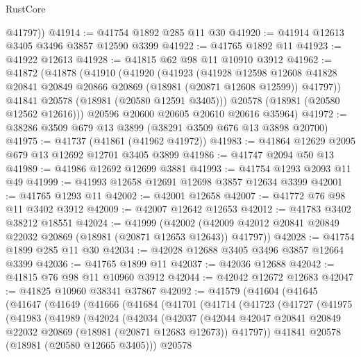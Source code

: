 \begin{lexlean}{RustCore}
\begin{coremodule}
        @41797))
@41914 := @41754 @1892 @285 @11 @30
@41920 := @41914 @12613 @3405 @3496 @3857 @12590 @3399
@41922 := @41765 @1892 @11
@41923 := @41922 @12613
@41928 := @41815 @62 @98 @11 @10910 @3912
@41962 := @41872
    (@41878
      (@41910
        (@41920
          (@41923
            (@41928
              @12598
              @12608
              @41828
              @20841
              @20849
              @20866
              @20869
              (@18981 (@20871 @12608 @12599))
              @41797))
          @41841
          @20578
          (@18981 (@20580 @12591 @3405)))
        @20578
        (@18981 (@20580 @12562 @12616)))
      @20596
      @20600
      @20605
      @20610
      @20616
      @35964)
@41972 := @38286 @3509 @679 @13 @3899 (@38291 @3509 @676 @13 @3898 @20700)
@41975 := @41737 (@41861 (@41962 @41972))
@41983 := @41864 @12629 @2095 @679 @13 @12692 @12701 @3405 @3899
@41986 := @41747 @2094 @50 @13
@41989 := @41986 @12692 @12699 @3881
@41993 := @41754 @1293 @2093 @11 @49
@41999 := @41993 @12658 @12691 @12698 @3857 @12634 @3399
@42001 := @41765 @1293 @11
@42002 := @42001 @12658
@42007 := @41772 @76 @98 @11 @3402 @3912
@42009 := @42007 @12642 @12653
@42012 := @41783 @3402 @38212 @18551
@42024 := @41999
    (@42002 (@42009 @42012 @20841 @20849 @22032 @20869 (@18981 (@20871 @12653 @12643)) @41797))
@42028 := @41754 @1899 @285 @11 @30
@42034 := @42028 @12688 @3405 @3496 @3857 @12664 @3399
@42036 := @41765 @1899 @11
@42037 := @42036 @12688
@42042 := @41815 @76 @98 @11 @10960 @3912
@42044 := @42042 @12672 @12683
@42047 := @41825 @10960 @38341 @37867
@42092 := @41579
    (@41604
      (@41645
        (@41647
          (@41649
            (@41666
              (@41684
                (@41701
                  (@41714
                    (@41723
                      (@41727
                        (@41975
                          (@41983
                            (@41989
                              (@42024
                                (@42034
                                  (@42037
                                    (@42044
                                      @42047
                                      @20841
                                      @20849
                                      @22032
                                      @20869
                                      (@18981 (@20871 @12683 @12673))
                                      @41797))
                                  @41841
                                  @20578
                                  (@18981 (@20580 @12665 @3405)))
                                @20578

\end{coremodule}
\end{lexlean}
